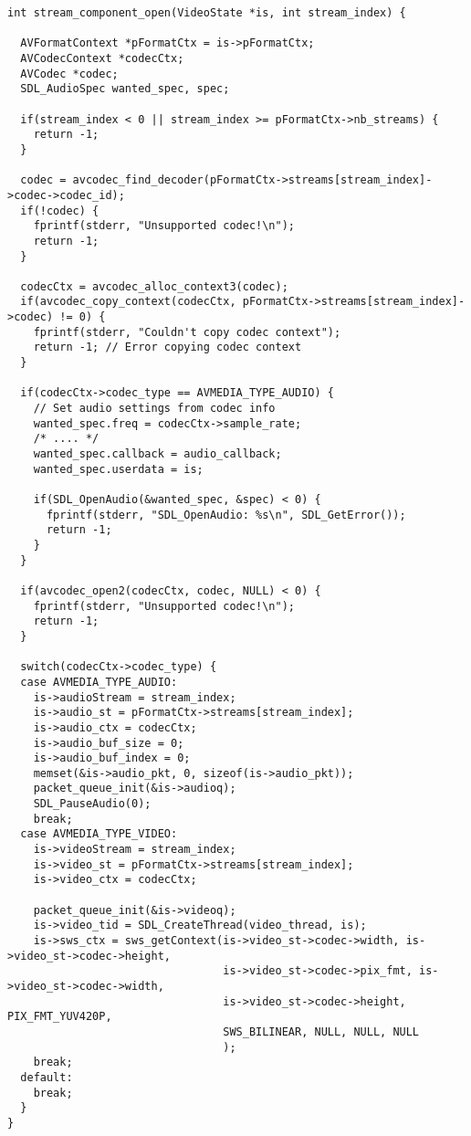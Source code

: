 \begin{lstlisting}
int stream_component_open(VideoState *is, int stream_index) {

  AVFormatContext *pFormatCtx = is->pFormatCtx;
  AVCodecContext *codecCtx;
  AVCodec *codec;
  SDL_AudioSpec wanted_spec, spec;

  if(stream_index < 0 || stream_index >= pFormatCtx->nb_streams) {
    return -1;
  }

  codec = avcodec_find_decoder(pFormatCtx->streams[stream_index]->codec->codec_id);
  if(!codec) {
    fprintf(stderr, "Unsupported codec!\n");
	return -1;
  }

  codecCtx = avcodec_alloc_context3(codec);
  if(avcodec_copy_context(codecCtx, pFormatCtx->streams[stream_index]->codec) != 0) {
    fprintf(stderr, "Couldn't copy codec context");
	return -1; // Error copying codec context
  }

  if(codecCtx->codec_type == AVMEDIA_TYPE_AUDIO) {
    // Set audio settings from codec info
    wanted_spec.freq = codecCtx->sample_rate;
    /* .... */
    wanted_spec.callback = audio_callback;
    wanted_spec.userdata = is;

    if(SDL_OpenAudio(&wanted_spec, &spec) < 0) {
      fprintf(stderr, "SDL_OpenAudio: %s\n", SDL_GetError());
      return -1;
    }
  }
  
  if(avcodec_open2(codecCtx, codec, NULL) < 0) {
    fprintf(stderr, "Unsupported codec!\n");
    return -1;
  }

  switch(codecCtx->codec_type) {
  case AVMEDIA_TYPE_AUDIO:
    is->audioStream = stream_index;
    is->audio_st = pFormatCtx->streams[stream_index];
	is->audio_ctx = codecCtx;
    is->audio_buf_size = 0;
    is->audio_buf_index = 0;
    memset(&is->audio_pkt, 0, sizeof(is->audio_pkt));
    packet_queue_init(&is->audioq);
    SDL_PauseAudio(0);
    break;
  case AVMEDIA_TYPE_VIDEO:
    is->videoStream = stream_index;
    is->video_st = pFormatCtx->streams[stream_index];
	is->video_ctx = codecCtx;

    packet_queue_init(&is->videoq);
    is->video_tid = SDL_CreateThread(video_thread, is);
	is->sws_ctx = sws_getContext(is->video_st->codec->width, is->video_st->codec->height,
	                             is->video_st->codec->pix_fmt, is->video_st->codec->width,
								 is->video_st->codec->height, PIX_FMT_YUV420P,
								 SWS_BILINEAR, NULL, NULL, NULL
                                 );
    break;
  default:
    break;
  }
}
\end{lstlisting}

